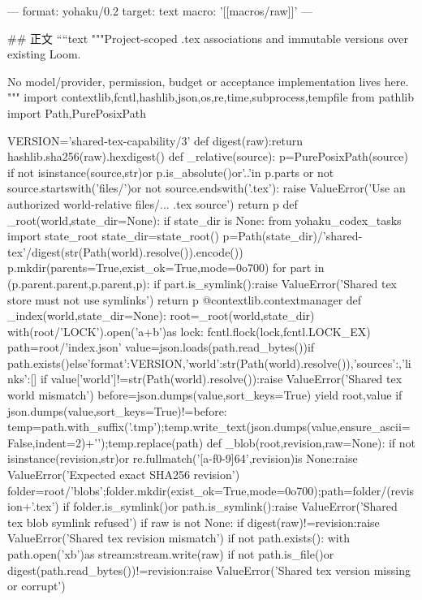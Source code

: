 ---
format: yohaku/0.2
target: text
macro: '[[macros/raw]]'
---

## 正文
````text
"""Project-scoped .tex associations and immutable versions over existing Loom.

No model/provider, permission, budget or acceptance implementation lives here.
"""
import contextlib,fcntl,hashlib,json,os,re,time,subprocess,tempfile
from pathlib import Path,PurePosixPath

VERSION='shared-tex-capability/3'
def digest(raw):return hashlib.sha256(raw).hexdigest()
def _relative(source):
    p=PurePosixPath(source)
    if not isinstance(source,str)or p.is_absolute()or'..'in p.parts or not source.startswith('files/')or not source.endswith('.tex'):
        raise ValueError('Use an authorized world-relative files/... .tex source')
    return p
def _root(world,state_dir=None):
    if state_dir is None:
        from yohaku_codex_tasks import state_root
        state_dir=state_root()
    p=Path(state_dir)/'shared-tex'/digest(str(Path(world).resolve()).encode())
    p.mkdir(parents=True,exist_ok=True,mode=0o700)
    for part in (p.parent.parent,p.parent,p):
        if part.is_symlink():raise ValueError('Shared tex store must not use symlinks')
    return p
@contextlib.contextmanager
def _index(world,state_dir=None):
    root=_root(world,state_dir)
    with(root/'LOCK').open('a+b')as lock:
        fcntl.flock(lock,fcntl.LOCK_EX)
        path=root/'index.json'
        value=json.loads(path.read_bytes())if path.exists()else{'format':VERSION,'world':str(Path(world).resolve()),'sources':{},'links':[]}
        if value['world']!=str(Path(world).resolve()):raise ValueError('Shared tex world mismatch')
        before=json.dumps(value,sort_keys=True)
        yield root,value
        if json.dumps(value,sort_keys=True)!=before:
            temp=path.with_suffix('.tmp');temp.write_text(json.dumps(value,ensure_ascii=False,indent=2)+'\n');temp.replace(path)
def _blob(root,revision,raw=None):
    if not isinstance(revision,str)or re.fullmatch('[a-f0-9]{64}',revision)is None:raise ValueError('Expected exact SHA256 revision')
    folder=root/'blobs';folder.mkdir(exist_ok=True,mode=0o700);path=folder/(revision+'.tex')
    if folder.is_symlink()or path.is_symlink():raise ValueError('Shared tex blob symlink refused')
    if raw is not None:
        if digest(raw)!=revision:raise ValueError('Shared tex revision mismatch')
        if not path.exists():
            with path.open('xb')as stream:stream.write(raw)
    if not path.is_file()or digest(path.read_bytes())!=revision:raise ValueError('Shared tex version missing or corrupt')
